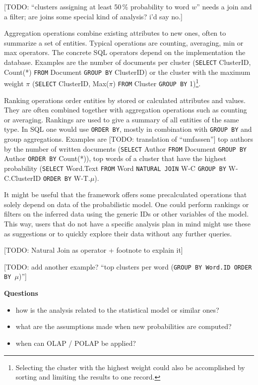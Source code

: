 [TODO: ``clusters assigning at least 50\,\% probability to word $w$'' needs a join and a filter; are joins some special kind of analysis? i'd say no.]

Aggregation operations combine existing attributes to new ones, often to summarize a set of entities. Typical operations are counting, averaging, min or max operators. The concrete SQL operators depend on the implementation the database. Examples are the number of documents per cluster (\texttt{SELECT} ClusterID, Count(*) \texttt{FROM} Document \texttt{GROUP BY} ClusterID) or the cluster with the maximum weight $\pi$ (\texttt{SELECT} ClusterID, Max($\pi$) \texttt{FROM} Cluster \texttt{GROUP BY} 1)\footnote{Selecting the cluster with the highest weight could also be accomplished by sorting and limiting the results to one record.}.

Ranking operations order entities by stored or calculated attributes and values. They are often combined together with aggregation operations such as counting or averaging. Rankings are used to give a summary of all entities of the same type. In SQL one would use \texttt{ORDER BY}, mostly in combination with \texttt{GROUP BY} and group aggregations. Examples are [TODO: translation of ``umfassen''] top authors by the number of written documents (\texttt{SELECT} Author \texttt{FROM} Document \texttt{GROUP BY} Author \texttt{ORDER BY} Count(*)), top words of a cluster that have the highest probability (\texttt{SELECT} Word.Text \texttt{FROM} Word \texttt{NATURAL JOIN} W-C \texttt{GROUP BY} W-C.ClusterID \texttt{ORDER BY} W-T.$\mu$).

It might be useful that the framework offers some precalculated operations that solely depend on data of the probabilistic model. One could perform rankings or filters on the inferred data using the generic IDs or other variables of the model. This way, users that do not have a specific analysis plan in mind might use these as suggestions or to quickly explore their data without any further queries.

[TODO: Natural Join as operator + footnote to explain it]

[TODO: add another example? ``top clusters per word (\texttt{GROUP BY \textrm{Word.ID} ORDER BY $\mu$})'']

\textbf{Questions}
\begin{itemize}
\item how is the analysis related to the statistical model or similar ones?
\item what are the assumptions made when new probabilities are computed?
\item when can OLAP / POLAP be applied?
\end{itemize}
